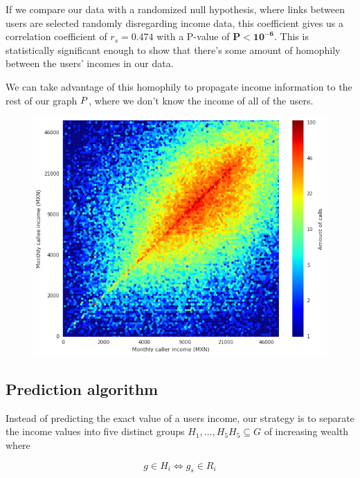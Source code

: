 If we compare our data with a randomized null hypothesis, where links between users are selected randomly disregarding income data, this coefficient gives us a correlation coefficient of $r_s = \mathbf{0.474} $ with a P-value of $ \mathbf{P < 10^{-6}} $. This is statistically significant enough to show that there's some amount of homophily between the users' incomes in our data.

We can take advantage of this homophily to propagate income information to the rest of our graph $ \mathlarger{P} $, where we don't know the income of all of the users.

\begin{figure}[h]
\begin{center}
\includegraphics[width=1\columnwidth]{figures/Homophily_income_origin_target_1/Homophily_income_origin_target_1.png}
\caption{ \protect}
\label{homophily_heatmap}
\end{center}
\end{figure}

\subsection{Prediction algorithm}

Instead of predicting the exact value of a users income, our strategy is to separate the income values into five distinct groups $ H_1, \ldots, H_5 H_5 \subseteq G$ of increasing wealth where

\[
	g \in H_i \iff g_s \in R_i
\]

